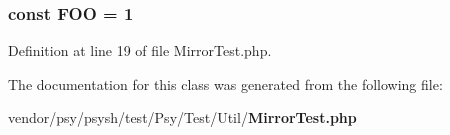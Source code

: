 \subsubsection[{F\+O\+O}]{\setlength{\rightskip}{0pt plus 5cm}const F\+O\+O = 1}\label{class_psy_1_1_test_1_1_util_1_1_mirror_test_a181b1bcfecee1c3345eec3c37055e480}


Definition at line 19 of file Mirror\+Test.\+php.



The documentation for this class was generated from the following file\+:\begin{DoxyCompactItemize}
\item 
vendor/psy/psysh/test/\+Psy/\+Test/\+Util/{\bf Mirror\+Test.\+php}\end{DoxyCompactItemize}
